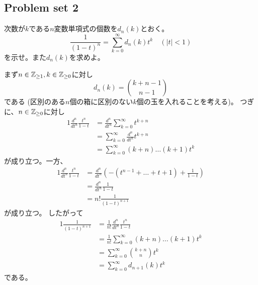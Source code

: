 \documentclass[report]{jlreq}
\begin{document}
\subsection{Problem set 2}

\begin{problem}[代数学II 2.19]
    次数が$k$である$n$変数単項式の個数を$d_n(k)$とおく。
    \begin{equation}
        \frac{1}{(1 - t)^n}
            = \sum_{k = 0}^\infty d_n(k) t^k
            \quad (|t| < 1)
    \end{equation}
    を示せ。また$d_n(k)$を求めよ。
\end{problem}

\begin{answer}
    \TODO{}
    まず$n \in \mathbb{Z}_{\ge 1}, k \in \mathbb{Z}_{\ge 0}$に対し
    \begin{equation}
        d_n(k) = \binom{k + n - 1}{n - 1}
    \end{equation}
    である (区別のある$n$個の箱に区別のない$k$個の玉を入れることを考える)。
    つぎに、$n \in \mathbb{Z}_{\ge 0}$に対し
    \begin{alignat}{1}
        \frac{d^n}{dt^n} \frac{t^n}{1 - t}
            &= \frac{d^n}{dt^n} \sum_{k = 0}^\infty t^{k + n} \\
            &= \sum_{k = 0}^\infty \frac{d^n}{dt^n} t^{k + n} \\
            &= \sum_{k = 0}^\infty (k + n) \dots (k + 1) t^k
    \end{alignat}
    が成り立つ。一方、
    \begin{alignat}{1}
        \frac{d^n}{dt^n} \frac{t^n}{1 - t}
            &= \frac{d^n}{dt^n} \left(
                - (t^{n-1} + \dots + t + 1) + \frac{1}{1 - t}
            \right) \\
            &= \frac{d^n}{dt^n} \frac{1}{1 - t} \\
            &= n! \frac{1}{(1 - t)^{n+1}}
    \end{alignat}
    が成り立つ。
    したがって
    \begin{alignat}{1}
        \frac{1}{(1 - t)^{n+1}}
            &= \frac{1}{n!} \frac{d^n}{dt^n} \frac{t^n}{1 - t} \\
            &= \frac{1}{n!} \sum_{k = 0}^\infty (k + n) \dots (k + 1) t^k \\
            &= \sum_{k = 0}^\infty \binom{k + n}{n}  t^k \\
            &= \sum_{k = 0}^\infty d_{n + 1}(k)  t^k
    \end{alignat}
    である。
\end{answer}
\end{document}
